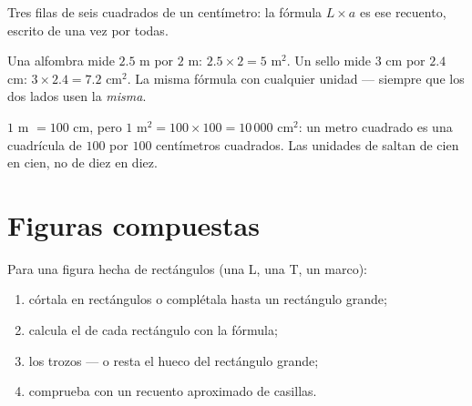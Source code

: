 \begin{omfigure}

{\small Tres filas de seis cuadrados de un centímetro: la fórmula
$L \times a$ es ese recuento, escrito de una vez por todas.}
\end{omfigure}

\begin{example}\label{ex:g5:areas:rectangle}
Una alfombra mide $2.5$ m por $2$ m:  $2.5 \times 2 = 5$ m$^2$.
Un sello mide $3$ cm por $2.4$ cm:  $3 \times 2.4 = 7.2$
cm$^2$. La misma fórmula con cualquier unidad --- siempre que los dos lados usen la
\emph{misma}.
\end{example}

\begin{example}\label{ex:g5:areas:units}
$1$ m $= 100$ cm, pero $1$ m$^2 = 100 \times 100 = 10\,000$ cm$^2$:
un metro cuadrado es una cuadrícula de $100$ por $100$ centímetros cuadrados. Las unidades
de  saltan de cien en cien, no de diez en diez.
\end{example}

\section{Figuras compuestas}

\begin{method}\label{met:g5:areas:composite}
Para una figura hecha de rectángulos (una L, una T, un marco):
\begin{enumerate}
  \item córtala en rectángulos o complétala hasta un rectángulo grande;
  \item calcula el  de cada rectángulo con la fórmula;
  \item {} los trozos --- o resta el hueco del rectángulo
        grande;
  \item comprueba con un recuento aproximado de casillas.
\end{enumerate}
\end{method}

